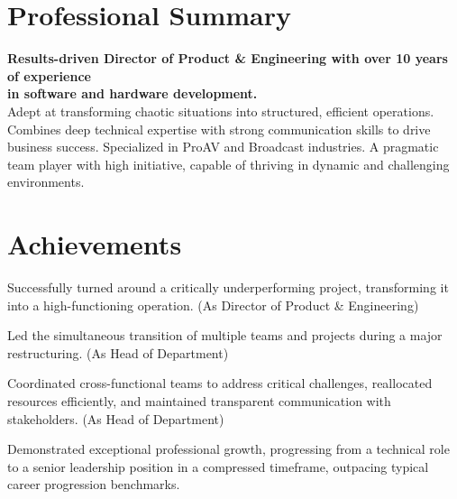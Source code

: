 \documentclass[]{external}
\begin{document}
\begin{paracol}{2}
    \switchcolumn[0]
    \section{Professional Summary}
    \textbf{Results-driven Director of Product \& Engineering with over 10 years of experience \\ in software and hardware development.} \\[3pt]
    Adept at transforming chaotic situations into structured, efficient operations. Combines deep technical expertise with strong communication skills to drive business success. Specialized in ProAV and Broadcast industries. A pragmatic team player with high initiative, capable of thriving in dynamic and challenging environments.
    \section{Achievements} 
    \begin{tightemize}
        \item Successfully turned around a critically underperforming project, transforming it into a high-functioning operation. (As Director of Product \& Engineering)
        \item Led the simultaneous transition of multiple teams and projects during a major restructuring. (As Head of Department)
        \item Coordinated cross-functional teams to address critical challenges, reallocated resources efficiently, and maintained transparent communication with stakeholders. (As Head of Department)
        \item Demonstrated exceptional professional growth, progressing from a technical role to a senior leadership position in a compressed timeframe, outpacing typical career progression benchmarks.
    \end{tightemize}

\end{paracol}
\end{document}
